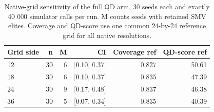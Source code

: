 \begin{table}[H]
\caption{Native-grid sensitivity of the full QD arm, 30 seeds each and exactly 40 000 simulator calls per run. M counts seeds with retained SMV elites. Coverage and QD-score use one common 24-by-24 reference grid for all native resolutions.}
\label{tab:v2_grid}
\centering
\small
\begin{tabular}{@{}lrrrrr@{}}
\toprule
Grid side & n & M & CI & Coverage ref & QD-score ref \\
\midrule
12 & 30 & 6 & [0.10, 0.37] & 0.827 & 50.61 \\
18 & 30 & 6 & [0.10, 0.37] & 0.835 & 47.39 \\
24 & 30 & 9 & [0.17, 0.48] & 0.837 & 46.38 \\
36 & 30 & 5 & [0.07, 0.34] & 0.835 & 40.39 \\
\bottomrule
\end{tabular}
\end{table}
